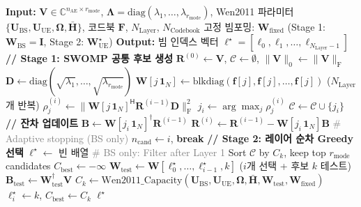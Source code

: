 \documentclass[10pt]{article}
\begin{document}
\begin{algorithm}[H]
\caption{Two-Stage SWOMP Beam Selection}
\begin{algorithmic}[1]
\STATE \textbf{Input:} $\mathbf{V} \in \mathbb{C}^{n_{\text{AE}} \times r_{\text{mode}}}$, $\boldsymbol{\Lambda} = \text{diag}(\lambda_1, \ldots, \lambda_{r_{\text{mode}}})$,
\STATE \quad\quad\quad Wen2011 파라미터 $\{\mathbf{U}_{\text{BS}}, \mathbf{U}_{\text{UE}}, \boldsymbol{\Omega}, \bar{\mathbf{H}}\}$,
\STATE \quad\quad\quad 코드북 $\mathbf{F}$, $N_{\text{Layer}}$, $N_{\text{Codebook}}$
\STATE \quad\quad\quad 고정 빔포밍: $\mathbf{W}_{\text{fixed}}$ (Stage 1: $\mathbf{W}_{\text{BS}} = \mathbf{I}$, Stage 2: $\mathbf{W}_{\text{UE}}^{\star}$)
\STATE \textbf{Output:} 빔 인덱스 벡터 $\boldsymbol{\ell}^{\star} = [\ell_0, \ell_1, \ldots, \ell_{N_{\text{Layer}}-1}]$
\STATE
\STATE \textbf{// Stage 1: SWOMP 공통 후보 생성}
\STATE $\mathbf{R}^{(0)} \gets \mathbf{V}$, $\mathcal{C} \gets \emptyset$, $\|\mathbf{V}\|_0 \gets \|\mathbf{V}\|_{\text{F}}$
\STATE $\mathbf{D} \gets \text{diag}(\sqrt{\lambda_1}, \ldots, \sqrt{\lambda_{r_{\text{mode}}}})$
        \STATE $\mathbf{W}[j\,\mathbf{1}_N] \gets \text{blkdiag}(\mathbf{f}[j], \mathbf{f}[j], \ldots, \mathbf{f}[j])$ \quad ($N_{\text{Layer}}$개 반복)
        \STATE $\rho_j^{(i)} \gets \|\mathbf{W}[j\,\mathbf{1}_N]^{\mathsf{H}} \mathbf{R}^{(i-1)} \mathbf{D}\|_{\text{F}}^2$
    \ENDFOR
    \STATE $j_i \gets \arg\max_j \rho_j^{(i)}$
    \STATE $\mathcal{C} \gets \mathcal{C} \cup \{j_i\}$
    \STATE \textbf{// 잔차 업데이트}
    \STATE $\mathbf{B} \gets \mathbf{W}[j_i\,\mathbf{1}_N]^{\dagger} \mathbf{R}^{(i-1)}$
    \STATE $\mathbf{R}^{(i)} \gets \mathbf{R}^{(i-1)} - \mathbf{W}[j_i\,\mathbf{1}_N] \mathbf{B}$
    \STATE \textcolor{gray}{\# Adaptive stopping (BS only)}
        \STATE $n_{\text{cand}} \gets i$, \textbf{break}
    \ENDIF
\ENDFOR
\STATE
\STATE \textbf{// Stage 2: 레이어 순차 Greedy 선택}
\STATE $\boldsymbol{\ell}^{\star} \gets$ 빈 배열
    \STATE \textcolor{gray}{\# BS only: Filter after Layer 1}
        \STATE Sort $\mathcal{C}$ by $C_k$, keep top $r_{\text{mode}}$ candidates
    \ENDIF
    \STATE $C_{\text{best}} \gets -\infty$
        \STATE $\mathbf{W}_{\text{test}} \gets \mathbf{W}[\ell_0^{\star}, \ldots, \ell_{i-1}^{\star}, k]$ \quad ($i$개 선택 + 후보 $k$ 테스트)
        \STATE $\mathbf{B}_{\text{test}} \gets \mathbf{W}_{\text{test}}^{\dagger} \mathbf{V}$
        \STATE $C_k \gets \text{Wen2011\_Capacity}(\mathbf{U}_{\text{BS}}, \mathbf{U}_{\text{UE}}, \boldsymbol{\Omega}, \bar{\mathbf{H}}, \mathbf{W}_{\text{test}}, \mathbf{W}_{\text{fixed}})$
            \STATE $\ell_i^{\star} \gets k$, $C_{\text{best}} \gets C_k$
        \ENDIF
    \ENDFOR
\ENDFOR
\STATE
\RETURN $\boldsymbol{\ell}^{\star}$
\end{algorithmic}
\end{algorithm}
\end{document}
